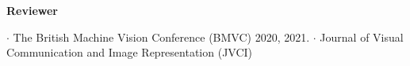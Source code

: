


\vspace{-.5em}
\textbf{Reviewer}
\begin{cvskills}
\cvskill
{} %
{\hspace{-3em} \textbf{$\cdot$} The British Machine Vision Conference (BMVC) 2020, 2021.}
\cvskill
{} %
{\hspace{-3em} \textbf{$\cdot$} Journal of Visual Communication and Image Representation (JVCI)}


\end{cvskills}
